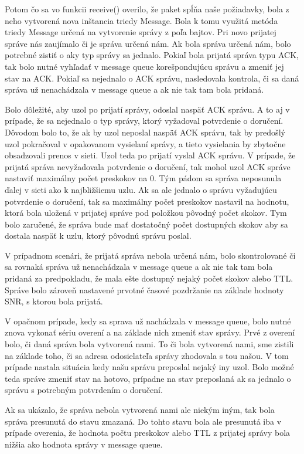 \documentclass[slovak,master]{diploma}
\begin{document}
Potom čo sa vo funkcii receive() overilo, že paket spĺňa naše požiadavky, bola z neho vytvorená nova inštancia triedy Message. Bola k tomu využitá metóda triedy Message určená na vytvorenie správy z 
poľa bajtov. Pri novo prijatej správe nás zaujímalo či je správa určená nám. Ak bola správa určená nám, bolo potrebné zistiť o aky typ správy sa jednalo. Pokiaľ bola prijatá správa typu ACK, tak bolo 
nutné vyhľadať v message queue korešpondujúcu správu a zmeniť jej stav na ACK. Pokiaľ sa nejednalo o ACK správu, nasledovala kontrola, či sa daná správa už nenachádzala v message queue a ak nie tak tam bola pridaná.

Bolo dôležité, aby uzol po prijatí správy, odoslal naspäť ACK správu. A to aj v prípade, že sa nejednalo o typ správy, ktorý vyžadoval potvrdenie o doručení. Dôvodom bolo to, že ak by 
uzol neposlal naspäť ACK správu, tak by predošlý uzol pokračoval v opakovanom vysielaní správy, a tieto vysielania by zbytočne obsadzovali prenos v sieti. Uzol teda po prijatí vyslal ACK správu. 
V prípade, že prijatá správa nevyžadovala potvrdenie o doručení, tak mohol uzol ACK správe nastaviť maximálny počet preskokov na 0. 
Tým pádom sa správa neposunula ďalej v sieti ako k najbližšiemu uzlu. Ak sa ale jednalo o správu vyžadujúcu potvrdenie o doručení, tak sa maximálny počet preskokov nastavil na 
hodnotu, ktorá bola uložená v prijatej správe pod položkou pôvodný počet skokov. 
Tym bolo zaručené, že správa bude mať dostatočný počet dostupných skokov aby sa dostala naspäť k uzlu, ktorý pôvodnú správu poslal.

V prípadnom scenári, že prijatá správa nebola určená nám, bolo skontrolované či sa rovnaká správa už nenachádzala v message queue a ak nie tak tam bola pridaná za predpokladu, že mala ešte dostupný 
nejaký počet skokov alebo TTL. Správe bolo zároveň nastavené prvotné časové pozdržanie na základe hodnoty SNR, s ktorou bola prijatá.

V opačnom prípade, kedy sa sprava už nachádzala v message queue, bolo nutné znova vykonať sériu overení a na základe nich zmeniť stav správy.
Prvé z overení bolo, či daná správa bola vytvorená nami. To či bola vytvorená nami, sme zistili na základe toho, či sa adresa odosielateľa správy zhodovala s tou našou. 
V tom prípade nastala situácia kedy našu správu preposlal nejaký iny uzol. Bolo možné teda správe zmeniť stav na hotovo, prípadne na stav preposlaná ak sa jednalo o správu s potrebným 
potvrdením o doručení.

Ak sa ukázalo, že správa nebola vytvorená nami ale niekým iným, tak bola správa presunutá do stavu zmazaná. Do tohto stavu bola ale presunutá iba v prípade overenia, že hodnota počtu preskokov alebo TTL 
z prijatej správy bola nižšia ako hodnota správy v message queue. %
\end{document}
